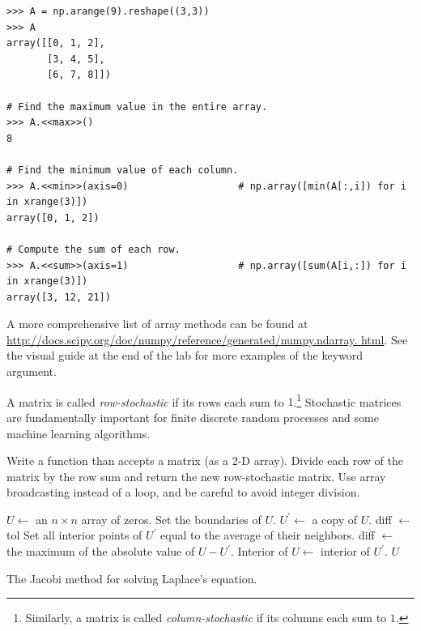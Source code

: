 \begin{lstlisting}
>>> A = np.arange(9).reshape((3,3))
>>> A
array([[0, 1, 2],
       [3, 4, 5],
       [6, 7, 8]])
       
# Find the maximum value in the entire array.
>>> A.<<max>>() 
8

# Find the minimum value of each column.
>>> A.<<min>>(axis=0)                   # np.array([min(A[:,i]) for i in xrange(3)])
array([0, 1, 2])

# Compute the sum of each row.
>>> A.<<sum>>(axis=1)                   # np.array([sum(A[i,:]) for i in xrange(3)])
array([3, 12, 21])
\end{lstlisting}

A more comprehensive list of array methods can be found at
\url{http://docs.scipy.org/doc/numpy/reference/generated/numpy.ndarray.
html}.
See the visual guide at the end of the lab for more examples of the  keyword argument.

\begin{problem} %
A matrix is called \emph{row-stochastic} if its rows each sum to $1$.\footnote{Similarly, a matrix is called \emph{column-stochastic} if its columns each sum to $1$.}
Stochastic matrices are fundamentally important for finite discrete random processes and some machine learning algorithms.

Write a function than accepts a matrix (as a 2-D array).
Divide each row of the matrix by the row sum and return the new row-stochastic matrix.
Use array broadcasting instead of a loop, and be careful to avoid integer division.
\end{problem}


\begin{algorithm} %
\begin{algorithmic}[1]
\State $U \gets$ an $n\times n$ array of zeros.
\State Set the boundaries of $U$.
\State $U^\prime \gets$ a copy of $U$.
\State diff $\gets$ tol
    \State Set all interior points of $U^\prime$ equal to the average of their neighbors.
    \State diff $\gets$ the maximum of the absolute value of $U - U^\prime$.
    \State Interior of $U \gets$ interior of $U^\prime $.
\EndWhile
\State {} $U$
\EndProcedure
\end{algorithmic}
\caption{The Jacobi method for solving Laplace's equation.}
\label{alg:jacobi}
\end{algorithm}

